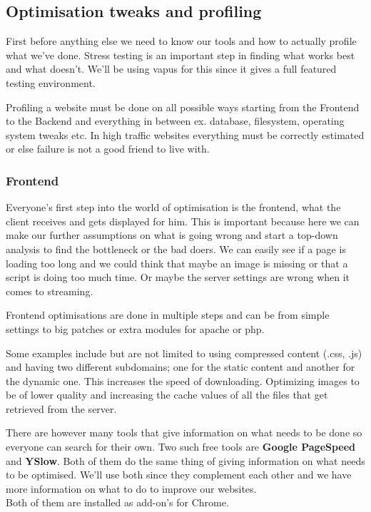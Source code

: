 \subsection{Optimisation tweaks and profiling}
First before anything else we need to know our tools and how to actually profile what we've done. 
Stress testing is an important step in finding what works best and what doesn't. We'll be using \gls{vapus} for this since it gives a full featured testing environment.

Profiling a website must be done on all possible ways starting from the Frontend to the Backend and everything in between ex. database, filesystem, operating system tweaks etc. In high traffic websites everything must be correctly estimated or else failure is not a good friend to live with.
\subsubsection{Frontend}\label{subsec:frontend}
Everyone's first step into the world of optimisation is the frontend, what the client receives and gets displayed for him. This is important because here we can make our further assumptions on what is going wrong and start a top-down analysis to find the bottleneck or the bad doers. We can easily see if a page is loading too long and we could think that maybe an image is missing or that a script is doing too much time. Or maybe the server settings are wrong when it comes to streaming.

Frontend optimisations are done in multiple steps and can be from simple settings to big patches or extra modules for \gls{apache} or \gls{php}.

Some examples include but are not limited to using compressed content (.css, .js) and having two different subdomains; one for the static content and another for the dynamic one. This increases the speed of downloading. Optimizing images to be of lower quality and increasing the cache values of all the files that get retrieved from the server. 

There are however many tools that give information on what needs to be done so everyone can search for their own. Two such free tools are \textbf{Google PageSpeed} and \textbf{YSlow}. Both of them do the same thing of giving information on what needs to be optimised. We'll use both since they complement each other and we have more information on what to do to improve our websites.
\\Both of them are installed as add-on's for Chrome.

